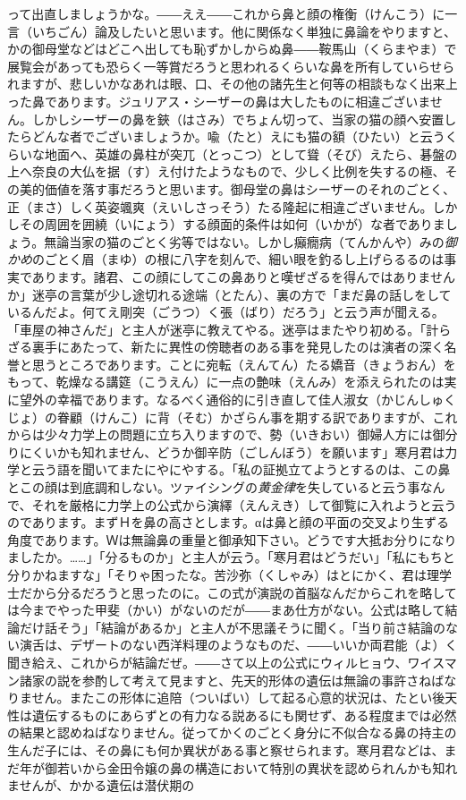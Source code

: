 \documentclass{book}
\begin{document}
って出直しましょうかな。――ええ――これから鼻と顔の権衡（けんこう）に一言（いちごん）論及したいと思います。他に関係なく単独に鼻論をやりますと、かの御母堂などはどこへ出しても恥ずかしからぬ鼻――鞍馬山（くらまやま）で展覧会があっても恐らく一等賞だろうと思われるくらいな鼻を所有していらせられますが、悲しいかなあれは眼、口、その他の諸先生と何等の相談もなく出来上った鼻であります。ジュリアス・シーザーの鼻は大したものに相違ございません。しかしシーザーの鼻を鋏（はさみ）でちょん切って、当家の猫の顔へ安置したらどんな者でございましょうか。喩（たと）えにも猫の額（ひたい）と云うくらいな地面へ、英雄の鼻柱が突兀（とっこつ）として聳（そび）えたら、碁盤の上へ奈良の大仏を据（す）え付けたようなもので、少しく比例を失するの極、その美的価値を落す事だろうと思います。御母堂の鼻はシーザーのそれのごとく、正（まさ）しく英姿颯爽（えいしさっそう）たる隆起に相違ございません。しかしその周囲を囲繞（いにょう）する顔面的条件は如何（いかが）な者でありましょう。無論当家の猫のごとく劣等ではない。しかし癲癇病（てんかんや）みの\emph{御かめ}のごとく眉（まゆ）の根に八字を刻んで、細い眼を釣るし上げらるるのは事実であります。諸君、この顔にしてこの鼻ありと嘆ぜざるを得んではありませんか」迷亭の言葉が少し途切れる途端（とたん）、裏の方で「まだ鼻の話しをしているんだよ。何てえ剛突（ごうつ）く張（ばり）だろう」と云う声が聞える。「車屋の神さんだ」と主人が迷亭に教えてやる。迷亭はまたやり初める。「計らざる裏手にあたって、新たに異性の傍聴者のある事を発見したのは演者の深く名誉と思うところであります。ことに宛転（えんてん）たる嬌音（きょうおん）をもって、乾燥なる講筵（こうえん）に一点の艶味（えんみ）を添えられたのは実に望外の幸福であります。なるべく通俗的に引き直して佳人淑女（かじんしゅくじょ）の眷顧（けんこ）に背（そむ）かざらん事を期する訳でありますが、これからは少々力学上の問題に立ち入りますので、勢（いきおい）御婦人方には御分りにくいかも知れません、どうか御辛防（ごしんぼう）を願います」寒月君は力学と云う語を聞いてまたにやにやする。「私の証拠立てようとするのは、この鼻とこの顔は到底調和しない。ツァイシングの\emph{黄金律}を失していると云う事なんで、それを厳格に力学上の公式から演繹（えんえき）して御覧に入れようと云うのであります。まずＨを鼻の高さとします。αは鼻と顔の平面の交叉より生ずる角度であります。Ｗは無論鼻の重量と御承知下さい。どうです大抵お分りになりましたか。\ldots{}\ldots{}」「分るものか」と主人が云う。「寒月君はどうだい」「私にもちと分りかねますな」「そりゃ困ったな。苦沙弥（くしゃみ）はとにかく、君は理学士だから分るだろうと思ったのに。この式が演説の首脳なんだからこれを略しては今までやった甲斐（かい）がないのだが――まあ仕方がない。公式は略して結論だけ話そう」「結論があるか」と主人が不思議そうに聞く。「当り前さ結論のない演舌は、デザートのない西洋料理のようなものだ、――いいか両君能（よ）く聞き給え、これからが結論だぜ。――さて以上の公式にウィルヒョウ、ワイスマン諸家の説を参酌して考えて見ますと、先天的形体の遺伝は無論の事許さねばなりません。またこの形体に追陪（ついばい）して起る心意的状況は、たとい後天性は遺伝するものにあらずとの有力なる説あるにも関せず、ある程度までは必然の結果と認めねばなりません。従ってかくのごとく身分に不似合なる鼻の持主の生んだ子には、その鼻にも何か異状がある事と察せられます。寒月君などは、まだ年が御若いから金田令嬢の鼻の構造において特別の異状を認められんかも知れませんが、かかる遺伝は潜伏期の
\end{document}
